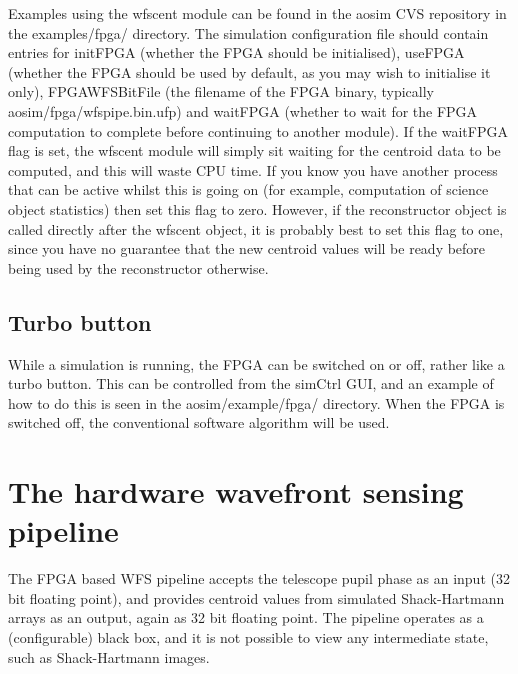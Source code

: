 \documentclass{article}
\begin{document}
Examples using the wfscent module can be found in the aosim CVS
repository in the examples/fpga/ directory.  The simulation
configuration file should contain entries for initFPGA (whether the
FPGA should be initialised), useFPGA (whether the FPGA should be used
by default, as you may wish to initialise it only), FPGAWFSBitFile
(the filename of the FPGA binary, typically
aosim/fpga/wfspipe.bin.ufp) and waitFPGA (whether to wait for the FPGA
computation to complete before continuing to another module).  If the
waitFPGA flag is set, the wfscent module will simply sit waiting for
the centroid data to be computed, and this will waste CPU time.  If
you know you have another process that can be active whilst this is
going on (for example, computation of science object statistics) then
set this flag to zero.  However, if the reconstructor object is called
directly after the wfscent object, it is probably best to set this
flag to one, since you have no guarantee that the new centroid values
will be ready before being used by the reconstructor otherwise.
\subsection{Turbo button}
While a simulation is running, the FPGA can be switched on or off,
rather like a turbo button.  This can be controlled from the simCtrl
GUI, and an example of how to do this is seen in the
aosim/example/fpga/ directory.  When the FPGA is switched off, the
conventional software algorithm will be used.

\section{The hardware wavefront sensing pipeline}
The FPGA based WFS pipeline accepts the telescope pupil phase as an
input (32 bit floating point), and provides centroid values from
simulated Shack-Hartmann arrays as an output, again as 32 bit floating
point.  The pipeline operates as a (configurable) black box, and it is
not possible to view any intermediate state, such as Shack-Hartmann images.
\end{document}
